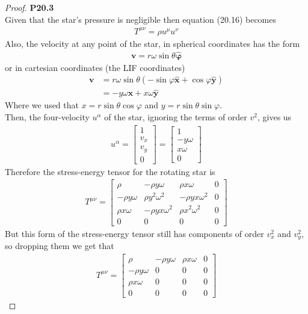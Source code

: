 \documentclass[11pt]{article}
\newcommand{\hatx}{\bm{\hat{x}}}
\newcommand{\haty}{\bm{\hat{y}}}
\newcommand{\hatphi}{\bm{\hat{\varphi}}}
\theoremstyle{definition}
\begin{document}
\cleardoublepage
\begin{proof}{\textbf{P20.3}}\\
Given that the star's pressure is negligible then equation (20.16) becomes
\begin{align*}
    T^{\mu\nu} = \rho u^\mu u^\nu
\end{align*}
Also, the velocity at any point of the star, in spherical coordinates has 
the form
\begin{align*}
    \bm{v} = r\omega \sin\theta \hatphi
\end{align*}
or in cartesian coordinates (the LIF coordinates)
\begin{align*}
    \bm{v} &= r\omega \sin\theta(-\sin\varphi \hatx + \cos\varphi \haty)\\
    &= -y\omega\hatx + x\omega\haty
\end{align*}
Where we used that $x = r\sin\theta\cos\varphi$ and $y = r\sin\theta\sin\varphi$.
\\
Then, the four-velocity $u^\alpha$ of the star, ignoring the terms of order $v^2$,
gives us
\begin{align*}
    u^\alpha = \begin{bmatrix}
        1 \\ v_x \\ v_y \\ 0
    \end{bmatrix}
    =
    \begin{bmatrix}
        1 \\ -y\omega \\ x\omega \\ 0
    \end{bmatrix}
\end{align*}
Therefore the stress-energy tensor for the rotating star is
\begin{align*}
    T^{\mu\nu} = \begin{bmatrix}
        \rho & -\rho y\omega & \rho x\omega & 0\\
        -\rho y\omega & \rho y^2\omega^2 & -\rho yx\omega^2 & 0\\
        \rho x\omega & -\rho yx\omega^2 & \rho x^2\omega^2 & 0\\
        0 &  0 & 0 & 0
    \end{bmatrix}
\end{align*}
But this form of the stress-energy tensor still has components of order $v_x^2$
and $v_y^2$, so dropping them we get that
\begin{align*}
    T^{\mu\nu} = \begin{bmatrix}
        \rho & -\rho y\omega & \rho x\omega & 0\\
        -\rho y\omega & 0 & 0 & 0\\
        \rho x\omega & 0 & 0 & 0\\
        0 &  0 & 0 & 0
    \end{bmatrix}
\end{align*}
\end{proof}
\end{document}
